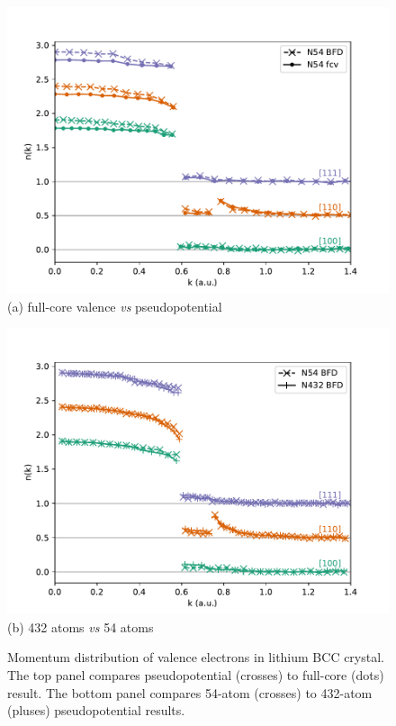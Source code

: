 \documentclass[aps,prb,showpacs,preprintnumbers,amsmath,amssymb,superscriptaddress,twocolumn]{revtex4-1}
\begin{document}
\begin{figure}[h]
\begin{minipage}{\columnwidth}
\includegraphics[width=\linewidth]{li57_dmcfc-fcv-dir}
(a) full-core valence \textit{vs} pseudopotential
\end{minipage}
\begin{minipage}{\columnwidth}
\includegraphics[width=\linewidth]{li52g_bfd-crystal-n54-n432-nk}
(b) 432 atoms \textit{vs} 54 atoms
\end{minipage}
\caption{Momentum distribution of valence electrons in lithium BCC crystal. The top panel compares pseudopotential (crosses) to full-core (dots) result.
The bottom panel compares 54-atom (crosses) to 432-atom (pluses) pseudopotential results.\label{fig:nk}}
\end{figure}
\end{document}
